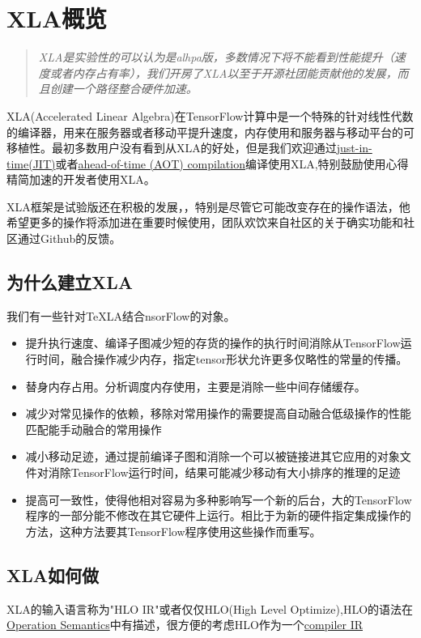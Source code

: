 \section{XLA概览}
\begin{quote}
\emph{XLA是实验性的可以认为是alhpa版，多数情况下将不能看到性能提升（速度或者内存占有率），我们开房了XLA以至于开源社团能贡献他的发展，而且创建一个路径整合硬件加速。}
\end{quote}
XLA(Accelerated Linear Algebra)在TensorFlow计算中是一个特殊的针对线性代数的编译器，用来在服务器或者移动平提升速度，内存使用和服务器与移动平台的可移植性。最初多数用户没有看到从XLA的好处，但是我们欢迎通过\href{https://www.tensorflow.org/performance/xla/jit}{just-in-time(JIT)}或者\href{https://www.tensorflow.org/performance/xla/tfcompile}{ahead-of-time (AOT) compilation}编译使用XLA,特别鼓励使用心得精简加速的开发者使用XLA。

XLA框架是试验版还在积极的发展，，特别是尽管它可能改变存在的操作语法，他希望更多的操作将添加进在重要时候使用，团队欢饮来自社区的关于确实功能和社区通过Github的反馈。
\subsection{为什么建立XLA}
我们有一些针对TeXLA结合nsorFlow的对象。
\begin{itemize}
	\item 提升执行速度、编译子图减少短的存货的操作的执行时间消除从TensorFlow运行时间，融合操作减少内存，指定tensor形状允许更多仅略性的常量的传播。
	\item 替身内存占用。分析调度内存使用，主要是消除一些中间存储缓存。
	\item 减少对常见操作的依赖，移除对常用操作的需要提高自动融合低级操作的性能匹配能手动融合的常用操作
	\item 减小移动足迹，通过提前编译子图和消除一个可以被链接进其它应用的对象文件对消除TensorFlow运行时间，结果可能减少移动有大小排序的推理的足迹
	\item 提高可一致性，使得他相对容易为多种影响写一个新的后台，大的TensorFlow程序的一部分能不修改在其它硬件上运行。相比于为新的硬件指定集成操作的方法，这种方法要其TensorFlow程序使用这些操作而重写。
\end{itemize}
\subsection{XLA如何做}
XLA的输入语言称为"HLO IR"或者仅仅HLO(High Level Optimize),HLO的语法在\href{https://www.tensorflow.org/performance/xla/operation_semantics}{Operation Semantics}中有描述，很方便的考虑HLO作为一个\href{https://en.wikipedia.org/wiki/Intermediate_representation}{compiler IR}

